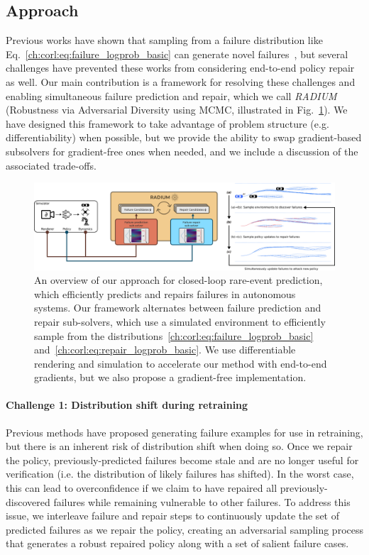 \subsection{Approach}

Previous works have shown that sampling from a failure distribution like Eq.~\eqref{ch:corl:eq:failure_logprob_basic} can generate novel failures~\cite{zhouRoCUSRobotController2021,sinhaNeuralBridgeSampling2020,deleckiModelbasedValidationProbabilistic2023a}, but several challenges have prevented these works from considering end-to-end policy repair as well. Our main contribution is a framework for resolving these challenges and enabling simultaneous failure prediction and repair, which we call \textit{RADIUM} (Robustness via Adversarial Diversity using MCMC, illustrated in Fig.~\ref{ch:corl:fig:architecture}). We have designed this framework to take advantage of problem structure (e.g. differentiability) when possible, but we provide the ability to swap gradient-based subsolvers for gradient-free ones when needed, and we include a discussion of the associated trade-offs.

\begin{figure}[tb]
    \centering
    \includegraphics[width=\linewidth]{images/corl/architecture.png}
    \caption{An overview of our approach for closed-loop rare-event prediction, which efficiently predicts and repairs failures in autonomous systems. Our framework alternates between failure prediction and repair sub-solvers, which use a simulated environment to efficiently sample from the distributions~\eqref{ch:corl:eq:failure_logprob_basic} and~\eqref{ch:corl:eq:repair_logprob_basic}. We use differentiable rendering and simulation to accelerate our method with end-to-end gradients, but we also propose a gradient-free implementation.}\label{ch:corl:fig:architecture}
\end{figure}

\paragraph{Challenge 1: Distribution shift during retraining} Previous methods have proposed generating failure examples for use in retraining, but there is an inherent risk of distribution shift when doing so. Once we repair the policy, previously-predicted failures become stale and are no longer useful for verification (i.e. the distribution of likely failures has shifted). In the worst case, this can lead to overconfidence if we claim to have repaired all previously-discovered failures while remaining vulnerable to other failures. To address this issue, we interleave failure and repair steps to continuously update the set of predicted failures as we repair the policy, creating an adversarial sampling process that generates a robust repaired policy along with a set of salient failure cases.

